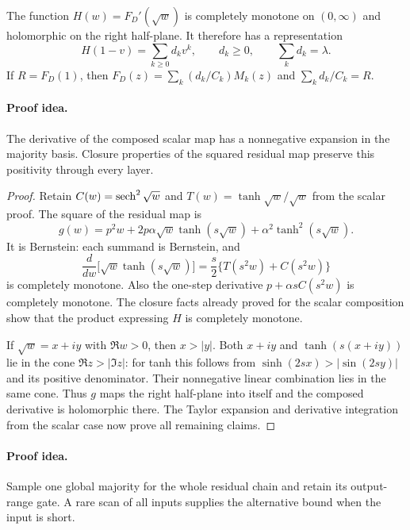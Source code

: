 \begin{lemma}
\label{lem:resglobalmajority}
The function $H(w)=F_D'(\sqrt w)$ is completely monotone on
$(0,\infty)$ and holomorphic on the right half-plane.
It therefore has a representation
\[
H(1-v)=\sum_{k\ge0}d_kv^k,
\qquad d_k\ge0,\qquad \sum_kd_k=\lambda.
\]
If $R=F_D(1)$, then
$F_D(z)=\sum_k(d_k/C_k)M_k(z)$ and
$\sum_kd_k/C_k=R$.
\end{lemma}
\paragraph{Proof idea.}
The derivative of the composed scalar map has a nonnegative expansion in the
majority basis. Closure properties of the squared residual map preserve this
positivity through every layer.

\begin{proof}
Retain $C(w)=\operatorname{sech}^2\sqrt w$ and
$T(w)=\tanh\sqrt w/\sqrt w$ from the scalar proof.
The square of the residual map is
\[
g(w)=p^2w+2p\alpha\sqrt w\tanh(s\sqrt w)
       +\alpha^2\tanh^2(s\sqrt w).
\]
It is Bernstein: each summand is Bernstein, and
\[
\frac d{dw}\bigl[\sqrt w\tanh(s\sqrt w)\bigr]
=\frac s2\{T(s^2w)+C(s^2w)\}
\]
is completely monotone.
Also the one-step derivative
$p+\alpha s C(s^2w)$ is completely monotone.
The closure facts already proved for the scalar composition show
that the product expressing $H$ is completely monotone.

If $\sqrt w=x+iy$ with $\Re w>0$, then $x>|y|$.
Both $x+iy$ and $\tanh(s(x+iy))$ lie in the cone
$\Re z>|\Im z|$: for tanh this follows from
$\sinh(2sx)>|\sin(2sy)|$ and its positive denominator.
Their nonnegative linear combination lies in the same cone.
Thus $g$ maps the right half-plane into itself and the composed
derivative is holomorphic there.
The Taylor expansion and derivative integration from the scalar
case now prove all remaining claims.
\end{proof}

\paragraph{Proof idea.}
Sample one global majority for the whole residual chain and retain its
output-range gate. A rare scan of all inputs supplies the alternative bound
when the input is short.

